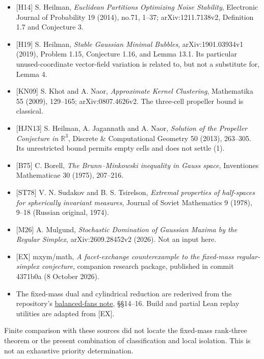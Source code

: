 \documentclass[
  11pt,
]{article}
\providecommand{\tightlist}{%
  \setlength{\itemsep}{0pt}\setlength{\parskip}{0pt}}
\begin{document}
\begin{itemize}
\tightlist
\item
  {[}H14{]} S. Heilman, \emph{Euclidean Partitions Optimizing Noise
  Stability}, Electronic Journal of Probability 19 (2014), no.71, 1--37;
  arXiv:1211.7138v2, Definition 1.7 and Conjecture 3.
\item
  {[}H19{]} S. Heilman, \emph{Stable Gaussian Minimal Bubbles},
  arXiv:1901.03934v1 (2019), Problem 1.15, Conjecture 1.16, and Lemma
  13.1. Its particular unused-coordinate vector-field variation is
  related to, but not a substitute for, Lemma 4.
\item
  {[}KN09{]} S. Khot and A. Naor, \emph{Approximate Kernel Clustering},
  Mathematika 55 (2009), 129--165; arXiv:0807.4626v2. The three-cell
  propeller bound is classical.
\item
  {[}HJN13{]} S. Heilman, A. Jagannath and A. Naor, \emph{Solution of
  the Propeller Conjecture in \(\mathbb R^3\)}, Discrete \&
  Computational Geometry 50 (2013), 263--305. Its unrestricted bound
  permits empty cells and does not settle (1).
\item
  {[}B75{]} C. Borell, \emph{The Brunn--Minkowski inequality in Gauss
  space}, Inventiones Mathematicae 30 (1975), 207--216.
\item
  {[}ST78{]} V. N. Sudakov and B. S. Tsirelson, \emph{Extremal
  properties of half-spaces for spherically invariant measures}, Journal
  of Soviet Mathematics 9 (1978), 9--18 (Russian original, 1974).
\item
  {[}M26{]} A. Mulgund, \emph{Stochastic Domination of Gaussian Maxima
  by the Regular Simplex}, arXiv:2609.28452v2 (2026). Not an input here.
\item
  {[}EX{]} mxym/math, \emph{A facet-exchange counterexample to the
  fixed-mass regular-simplex conjecture}, companion research package,
  published in commit 4371b0a (8 October 2026).
\item
  The fixed-mass dual and cylindrical reduction are rederived from the
  repository's
  \href{../gaussian-propeller-balanced-fans/paper.md}{balanced-fans
  note}, §§14--16. Build and partial Lean replay utilities are adapted
  from {[}EX{]}.
\end{itemize}

Finite comparison with these sources did not locate the fixed-mass
rank-three theorem or the present combination of classification and
local isolation. This is not an exhaustive priority determination.
\end{document}
